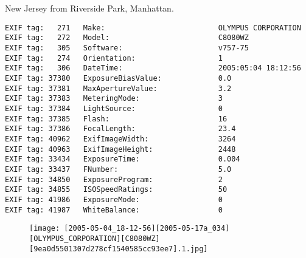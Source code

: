 \section{\protect{}}
\noindent New Jersey from Riverside Park, Manhattan.
\noindent
\begin{lstlisting}
EXIF tag:   271   Make:                          OLYMPUS CORPORATION
EXIF tag:   272   Model:                         C8080WZ
EXIF tag:   305   Software:                      v757-75
EXIF tag:   274   Orientation:                   1
EXIF tag:   306   DateTime:                      2005:05:04 18:12:56
EXIF tag: 37380   ExposureBiasValue:             0.0
EXIF tag: 37381   MaxApertureValue:              3.2
EXIF tag: 37383   MeteringMode:                  3
EXIF tag: 37384   LightSource:                   0
EXIF tag: 37385   Flash:                         16
EXIF tag: 37386   FocalLength:                   23.4
EXIF tag: 40962   ExifImageWidth:                3264
EXIF tag: 40963   ExifImageHeight:               2448
EXIF tag: 33434   ExposureTime:                  0.004
EXIF tag: 33437   FNumber:                       5.0
EXIF tag: 34850   ExposureProgram:               2
EXIF tag: 34855   ISOSpeedRatings:               50
EXIF tag: 41986   ExposureMode:                  0
EXIF tag: 41987   WhiteBalance:                  0

\end{lstlisting}
\clearpage
\begin{figure}
\raggedleft
\texttt{[image: [2005-05-04\_18-12-56][2005-05-17a\_034][OLYMPUS\_CORPORATION][C8080WZ][9ea0d5501307d278cf1540585cc93ee7].1.jpg]}
\end{figure}


\clearpage
